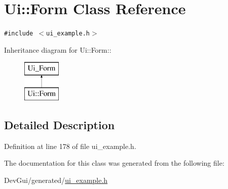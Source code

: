 \hypertarget{classUi_1_1Form}{
\section{Ui::Form Class Reference}
\label{classUi_1_1Form}
}
{\tt \#include $<$ui\_\-example.h$>$}

Inheritance diagram for Ui::Form::\begin{figure}[H]
\begin{center}
\leavevmode
\includegraphics[height=2cm]{classUi_1_1Form}
\end{center}
\end{figure}


\subsection{Detailed Description}


Definition at line 178 of file ui\_\-example.h.

The documentation for this class was generated from the following file:\begin{CompactItemize}
\item 
DevGui/generated/\hyperlink{ui__example_8h}{ui\_\-example.h}\end{CompactItemize}
